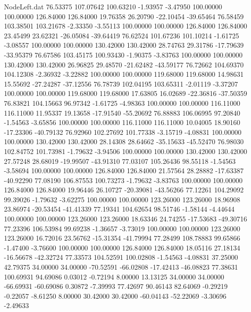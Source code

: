 \begin{filecontents}{NodeLeft.dat}
  76.53375  107.07642  100.63210    -1.93957   -3.47950  100.00000  100.00000  126.84000  126.84000   19.76358   26.20790  -22.10454  -39.65464
  76.58459  103.38501  103.21678    -2.33350   -3.55113  100.00000  100.00000  126.84000  126.84000   23.45499   23.62321  -26.05084  -39.64419
  76.62524  101.67236  101.10214    -1.61725   -3.08557  100.00000  100.00000  130.42000  130.42000   28.74763   29.31786  -17.79639  -33.95379
  76.67586  103.45175  100.93430    -1.90375   -3.83763  100.00000  100.00000  130.42000  130.42000   26.96825   29.48570  -21.62482  -43.59177
  76.72662  104.69370  104.12308    -2.36932   -3.22882  100.00000  100.00000  119.68000  119.68000   14.98631   15.55692  -27.24287  -37.12556
  76.78739  102.04195  103.65311    -2.01119   -3.37207  100.00000  100.00000  119.68000  119.68000   17.63805   16.02689  -22.36816  -37.50359
  76.83821  104.15663   96.97342    -1.61725   -4.98363  100.00000  100.00000  116.11000  116.11000   11.95337   19.13658  -17.91540  -55.20692
  76.88883  106.06995   97.20840    -1.54563   -3.65856  100.00000  100.00000  116.11000  116.11000   10.04005   18.90160  -17.23306  -40.79132
  76.92960  102.27692  101.77338    -3.15719   -4.08831  100.00000  100.00000  130.42000  130.42000   28.14308   28.64662  -35.15633  -45.52470
  76.98030  102.84752  101.73981    -1.79632   -3.94506  100.00000  100.00000  130.42000  130.42000   27.57248   28.68019  -19.99507  -43.91310
  77.03107  105.26436   98.55118    -1.54563   -3.58694  100.00000  100.00000  126.84000  126.84000   21.57564   28.28882  -17.63387  -40.92290
  77.08190  106.87553  100.73273    -1.79632   -3.83763  100.00000  100.00000  126.84000  126.84000   19.96446   26.10727  -20.39081  -43.56266
  77.12261  104.29092   99.39026    -1.79632   -3.62275  100.00000  100.00000  123.26000  123.26000   18.96908   23.86974  -20.53454  -41.41339
  77.19341  104.62654   98.51746    -1.58144   -4.44644  100.00000  100.00000  123.26000  123.26000   18.63346   24.74255  -17.53683  -49.30716
  77.23396  106.53984   99.69238    -1.36657   -3.73019  100.00000  100.00000  123.26000  123.26000   16.72016   23.56762  -15.31354  -41.79994
  77.28499  108.78883   99.65866    -1.47400   -3.76600  100.00000  100.00000  126.84000  126.84000   18.05116   27.18134  -16.56678  -42.32724
  77.33573  104.52591  100.02808    -1.54563   -4.08831   37.25000   42.79375   34.00000   34.00000  -70.52591  -66.02808  -17.42413  -46.08823
  77.38631  100.69931   94.69086     0.03012   -0.72194    8.00000   13.13125   34.00000   34.00000  -66.69931  -60.69086    0.30872   -7.39993
  77.42697   90.46143   82.64069    -0.29219   -0.22057   -8.61250    8.00000   30.42000   30.42000  -60.04143  -52.22069   -3.30696   -2.49633

\end{filecontents}
